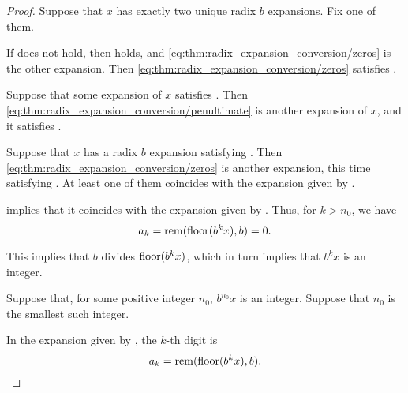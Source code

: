 \begin{proof}
   Suppose that \( x \) has exactly two unique radix \( b \) expansions. Fix one of them.

  If  does not hold, then  holds, and \eqref{eq:thm:radix_expansion_conversion/zeros} is the other expansion. Then \eqref{eq:thm:radix_expansion_conversion/zeros} satisfies .

   Suppose that some expansion of \( x \) satisfies . Then \eqref{eq:thm:radix_expansion_conversion/penultimate} is another expansion of \( x \), and it satisfies .

   Suppose that \( x \) has a radix \( b \) expansion satisfying . Then \eqref{eq:thm:radix_expansion_conversion/zeros} is another expansion, this time satisfying . At least one of them coincides with the expansion given by .

   implies that it coincides with the expansion given by . Thus, for \( k > n_0 \), we have
  \begin{equation*}
    a_k = \operatorname{rem}(\operatorname{floor}(b^k x), b) = 0.
  \end{equation*}

  This implies that \( b \) divides \( \operatorname{floor}(b^k x) \), which in turn implies that \( b^k x \) is an integer.

   Suppose that, for some positive integer \( n_0 \), \( b^{n_0} x \) is an integer. Suppose that \( n_0 \) is the smallest such integer.

  In the expansion given by , the \( k \)-th digit is
  \begin{equation*}
    a_k = \operatorname{rem}(\operatorname{floor}(b^k x), b).
  \end{equation*}


\end{proof}

